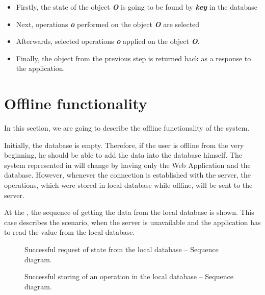 \begin{itemize}
\item Firstly, the state of the object \textit{\textbf{O}} is going to be found by \textit{\textbf{key}} in the database
\item Next, operations \textit{\textbf{o}} performed on the object \textit{\textbf{O}} are selected
\item Afterwards, selected operations \textit{\textbf{o}} applied on the object \textit{\textbf{O}}.
\item Finally, the object from the previous step is returned back as a response to the application.
\end{itemize} 

\section{Offline functionality}

In this section, we are going to describe the offline functionality of the system.

Initially, the database is empty. Therefore, if the user is offline from the very beginning, he should be able to add the data into the database himself. 
The system represented in  will change by having only the Web Application and the database. However, whenever the connection is established with the server, the operations, which were stored in local database while offline, will be sent to the server. 

At the , the sequence of getting the data from the local database is shown. This case describes the scenario, when the server is unavailable and the application has to read the value from the local database. 

\begin{figure}[!htb]
    \begin{center}
    \def\svgwidth{\columnwidth}
    
    \caption {Successful request of state from the local database -- Sequence diagram.}
    \label{fig:design6}
\end{center}
\end{figure}


\begin{figure}[!htb]
    \begin{center}
    \def\svgwidth{\columnwidth}
    
    \caption {Successful storing of an operation in the local database -- Sequence diagram.}
    \label{fig:design7}
\end{center}
\end{figure}

